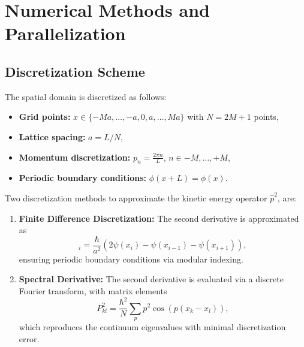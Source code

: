 \documentclass[12pt,a4paper]{report}
\begin{document}
\chapter{Numerical Methods and Parallelization}

\section{Discretization Scheme}
The spatial domain is discretized as follows:
\begin{itemize}
    \item \textbf{Grid points:} $x \in \{-Ma, \ldots , -a, 0, a, \ldots , Ma\}$ with $N = 2M+1$ points,
    \item \textbf{Lattice spacing:} $a = L/N$,
    \item \textbf{Momentum discretization:} $p_n = \frac{2 \pi n}{L}$, \; $n \in -M, \ldots , +M$,
    \item \textbf{Periodic boundary conditions:} $\phi(x+L) = \phi(x)$.
\end{itemize}
Two discretization methods to approximate the kinetic energy operator $\hat{p}^2$, are:
\begin{enumerate}
    \item \textbf{Finite Difference Discretization:} The second derivative is approximated as
    \begin{equation}
    [\hat{p}^2 \psi]_i= \frac{\hbar}{a^2}\left(2\psi(x_i)-\psi(x_{i-1})-\psi(x_{i+1})\right),
    \end{equation}
    ensuring periodic boundary conditions via modular indexing.
    \item \textbf{Spectral Derivative:} The second derivative is evaluated via a discrete Fourier transform, with matrix elements
    \begin{equation}
    P^2_{kl} = \frac{\hbar^2}{N}\sum_p p^2 \cos\left(p(x_k-x_l)\right),
    \end{equation}
    which reproduces the continuum eigenvalues with minimal discretization error.
\end{enumerate}
\end{document}

